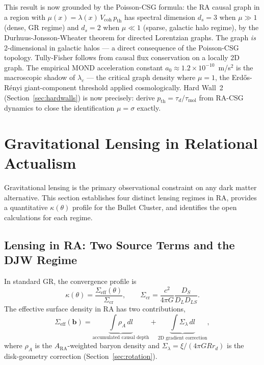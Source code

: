 \documentclass[11pt,a4paper]{article}
\theoremstyle{plain}
\theoremstyle{definition}
\theoremstyle{remark}
\begin{document}
This result is now grounded by the Poisson-CSG formula: the RA causal
graph in a region with $\mu(x) = \lambda(x)\,V_{\mathrm{coh}}\,p_{\mathrm{th}}$
has spectral dimension $d_s = 3$ when $\mu \gg 1$ (dense, GR regime)
and $d_s = 2$ when $\mu \ll 1$ (sparse, galactic halo regime), by the
Durhuus-Jonsson-Wheater theorem for directed Lorentzian graphs.
The graph \emph{is} 2-dimensional in galactic halos --- a direct consequence of the
Poisson-CSG topology. Tully-Fisher follows from causal flux conservation
on a locally 2D graph. The empirical MOND acceleration constant
$a_0 \approx 1.2\times10^{-10}$~m/s$^2$ is the macroscopic shadow of
$\lambda_c$ --- the critical graph density where $\mu = 1$, the
Erd\H{o}s-R\'{e}nyi giant-component threshold applied cosmologically.
Hard Wall~2 (Section~\ref{sec:hardwalls}) is now precisely: derive
$p_{\mathrm{th}} = \tau_d/\tau_{\mathrm{mol}}$ from RA-CSG dynamics
to close the identification $\mu = \sigma$ exactly.

\section{Gravitational Lensing in Relational Actualism}
\label{sec:lensing}

Gravitational lensing is the primary observational constraint on any
dark matter alternative. This section establishes four distinct lensing
regimes in RA, provides a quantitative $\kappa(\theta)$ profile for the
Bullet Cluster, and identifies the open calculations for each regime.

\subsection{Lensing in RA: Two Source Terms and the DJW Regime}
\label{sec:lensing_sources}

In standard GR, the convergence profile is
\begin{equation}
  \kappa(\theta) = \frac{\Sigma_{\mathrm{eff}}(\theta)}{\Sigma_{\mathrm{cr}}},
  \qquad
  \Sigma_{\mathrm{cr}} = \frac{c^2}{4\pi G}\frac{D_S}{D_L D_{LS}}.
\end{equation}
The effective surface density in RA has two contributions,
\begin{equation}
  \Sigma_{\mathrm{eff}}(\mathbf{b})
  = \underbrace{\int \rho_A\,dl}_{\text{accumulated causal depth}}
  + \underbrace{\int \Sigma_\lambda\,dl}_{\text{2D gradient correction}},
  \label{eq:Sigma_RA}
\end{equation}
where $\rho_A$ is the $A_{\mathrm{RA}}$-weighted baryon density and
$\Sigma_\lambda = \xi/(4\pi G R r_d)$ is the disk-geometry correction
(Section~\ref{sec:rotation}).
\end{document}
